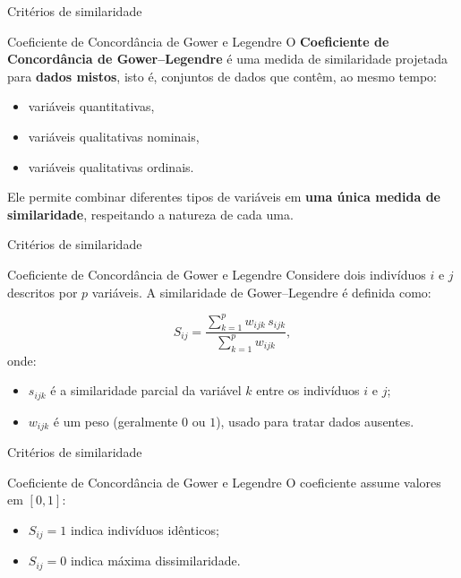 \documentclass[
  ignorenonframetext,
  aspectratio=169,
]{beamer}
\providecommand{\tightlist}{%
  \setlength{\itemsep}{0pt}\setlength{\parskip}{0pt}}
\begin{document}
\begin{frame}{Critérios de similaridade}
\protect{}\label{crituxe9rios-de-similaridade-6}
\begin{block}{Coeficiente de Concordância de Gower e Legendre}
\protect{}\label{coeficiente-de-concorduxe2ncia-de-gower-e-legendre}
O \textbf{Coeficiente de Concordância de Gower--Legendre} é uma medida
de similaridade projetada para \textbf{dados mistos}, isto é, conjuntos
de dados que contêm, ao mesmo tempo:

\begin{itemize}
\tightlist
\item
  variáveis quantitativas,
\item
  variáveis qualitativas nominais,
\item
  variáveis qualitativas ordinais.
\end{itemize}

Ele permite combinar diferentes tipos de variáveis em \textbf{uma única
medida de similaridade}, respeitando a natureza de cada uma.
\end{block}
\end{frame}

\begin{frame}{Critérios de similaridade}
\protect{}\label{crituxe9rios-de-similaridade-7}
\begin{block}{Coeficiente de Concordância de Gower e Legendre}
\protect{}\label{coeficiente-de-concorduxe2ncia-de-gower-e-legendre-1}
Considere dois indivíduos \(i\) e \(j\) descritos por \(p\) variáveis. A
similaridade de Gower--Legendre é definida como:

\[
S_{ij}
=
\dfrac{\sum_{k=1}^{p} w_{ijk}\, s_{ijk}}
{\sum_{k=1}^{p} w_{ijk}},
\] onde:

\begin{itemize}
\tightlist
\item
  \(s_{ijk}\) é a similaridade parcial da variável \(k\) entre os
  indivíduos \(i\) e \(j\);
\item
  \(w_{ijk}\) é um peso (geralmente \(0\) ou \(1\)), usado para tratar
  dados ausentes.
\end{itemize}
\end{block}
\end{frame}

\begin{frame}{Critérios de similaridade}
\protect{}\label{crituxe9rios-de-similaridade-8}
\begin{block}{Coeficiente de Concordância de Gower e Legendre}
\protect{}\label{coeficiente-de-concorduxe2ncia-de-gower-e-legendre-2}
O coeficiente assume valores em \([0,1]\):

\begin{itemize}
\tightlist
\item
  \(S_{ij} = 1\) indica indivíduos idênticos;
\item
  \(S_{ij} = 0\) indica máxima dissimilaridade.
\end{itemize}
\end{block}
\end{frame}
\end{document}
